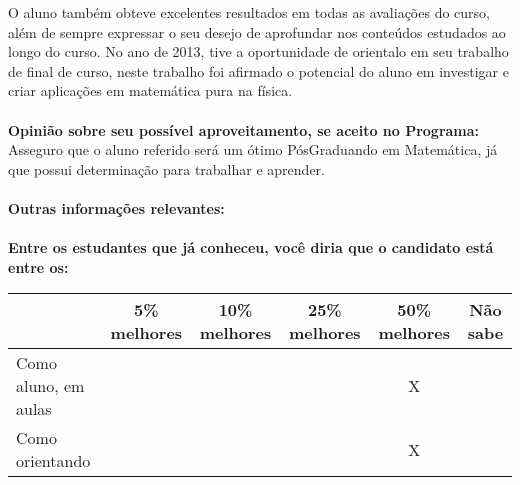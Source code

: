 \documentclass[11pt]{article}
\begin{document}
	O aluno também obteve excelentes resultados em todas as avaliações do curso, além de sempre expressar o seu desejo de aprofundar nos conteúdos estudados ao longo do curso.
	No ano de 2013, tive a oportunidade de orientalo em seu trabalho de final de curso, neste trabalho foi afirmado o potencial do aluno em investigar  e criar aplicações em matemática pura na física.\\
\\
\textbf{Opinião sobre seu possível aproveitamento, se aceito no Programa:}
\\Asseguro que o aluno referido será um ótimo PósGraduando em Matemática, já que possui determinação para trabalhar e aprender.\\ 
\\
\textbf{Outras informações relevantes:} \\
\\[0.3cm]
\textbf{Entre os estudantes que já conheceu, você diria que o candidato está entre os:}
\\
\begin{tabular}{|l|c|c|c|c|c|}
\hline
 & 5\% melhores & 10\% melhores & 25\% melhores & 50\% melhores & Não sabe \\
\hline
Como aluno, em aulas &  &  &  & X & \\
\hline
Como orientando &  &  &  & X & \\
\hline
\end{tabular}
\end{document}
